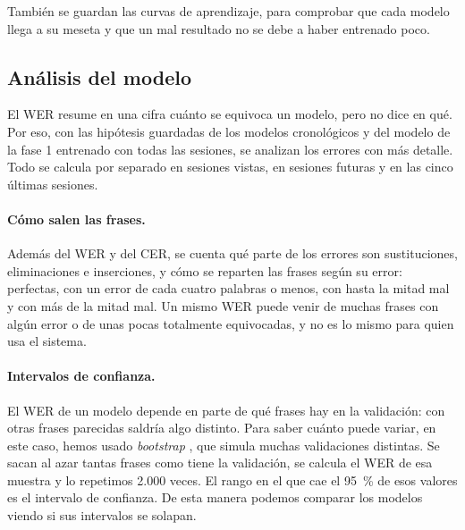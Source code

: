 También se guardan las curvas de aprendizaje, para comprobar que cada modelo llega a su meseta y que un mal resultado no se debe a haber entrenado poco.

\subsection{Análisis del modelo}
\label{sec:analisis-modelo}

El WER resume en una cifra cuánto se equivoca un modelo, pero no dice en qué. Por eso, con las hipótesis guardadas de los modelos cronológicos y del modelo de la fase 1 entrenado con todas las sesiones, se analizan los errores con más detalle. Todo se calcula por separado en sesiones vistas, en sesiones futuras y en las cinco últimas sesiones.

\paragraph{Cómo salen las frases.} Además del WER y del CER, se cuenta qué parte de los errores son sustituciones, eliminaciones e inserciones, y cómo se reparten las frases según su error: perfectas, con un error de cada cuatro palabras o menos, con hasta la mitad mal y con más de la mitad mal. Un mismo WER puede venir de muchas frases con algún error o de unas pocas totalmente equivocadas, y no es lo mismo para quien usa el sistema.

\paragraph{Intervalos de confianza.} El WER de un modelo depende en parte de qué frases hay en la validación: con otras frases parecidas saldría algo distinto. Para saber cuánto puede variar, en este caso, hemos usado \textit{bootstrap} \cite{bisani2004bootstrap}, que simula muchas validaciones distintas. Se sacan al azar tantas frases como tiene la validación, se calcula el WER de esa muestra y lo repetimos 2.000 veces. El rango en el que cae el \SI{95}{\percent} de esos valores es el intervalo de confianza. De esta manera podemos comparar los modelos viendo si sus intervalos se solapan.

